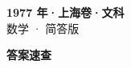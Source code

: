 \documentclass[zihao=-4, a4paper]{ctexart}
\begin{document}
\begin{center}
  {\Large\bfseries 1977 年·上海卷·文科}\\[4pt]
  {\large 数学 · 简答版}
\end{center}
\medskip
{}

\clearpage
{}
\begin{center}{\Large\bfseries 答案速查}\end{center}
\medskip

\end{document}
